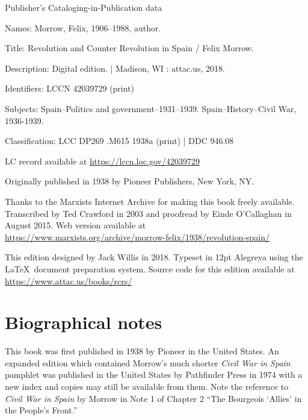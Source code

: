 {
\setlength{\parindent}{0em}
\setlength{\parskip}{0.5em}
\sloppy

\vspace*{\fill}

Publisher’s Cataloging-in-Publication data

\vspace{0.5em}

{\setlength{\parskip}{0em}
Names: Morrow, Felix, 1906--1988, author.

Title: Revolution and Counter Revolution in Spain / Felix Morrow.

Description: Digital edition. | Madison, WI : 
attac.us, 2018.

Identifiers: LCCN 42039729 (print)

\hangindent=0.7cm
Subjects: Spain--Politics and government--1931--1939. Spain--History--Civil War, 1936-1939.

Classification: LCC DP269 .M615 1938a (print) | DDC 946.08

LC record available at \url{https://lccn.loc.gov/42039729}
}

\vspace*{\fill}

Originally published in 1938 by Pioneer Publishers, New York, NY.

Thanks to the Marxists Internet Archive
for making this book freely available.
Transcribed by Ted Crawford in 2003
and proofread by Einde O’Callaghan in August 2015.
Web version available at
\url{https://www.marxists.org/archive/morrow-felix/1938/revolution-spain/}

This edition designed by Jack Willis in 2018.
Typeset in 12pt Alegreya using the \LaTeX\ document preparation system.
Source code for this edition available at \url{https://www.attac.us/books/rcrs/}
}

\newpage

\chapter{Biographical notes}

This book was first published in 1938 by Pioneer in the United States.
An expanded edition which contained Morrow’s much shorter \emph{Civil War in Spain} pamphlet was published in the United States by Path\-finder Press in 1974 with a new index and copies may still be available from them. Note the reference to \emph{Civil War in Spain} by Morrow in Note 1 of Chapter 2 ``The Bourgeois ‘Allies’ in the People’s Front.''

